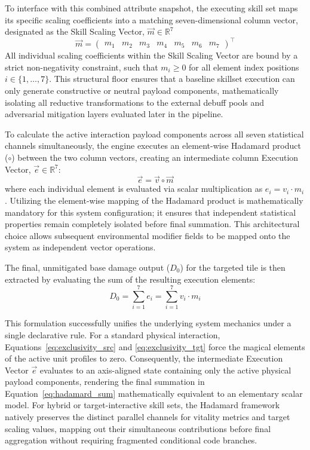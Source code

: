 \documentclass[twocolumn,10pt]{article}
\begin{document}
To interface with this combined attribute snapshot, the executing skill set maps its specific scaling coefficients into a matching seven-dimensional column vector, designated as the Skill Scaling Vector, $\vec{m} \in \mathbb{R}^7$
\begin{equation}
\vec{m} = \begin{pmatrix} m_1 & m_2 & m_3 & m_4 & m_5 & m_6 & m_7 \end{pmatrix}^{\top}
\end{equation}
All individual scaling coefficients within the Skill Scaling Vector are bound by a strict non-negativity constraint, such that $m_i \ge 0$ for all element index positions $i \in \{1, \dots, 7\}$. This structural floor ensures that a baseline skillset execution can only generate constructive or neutral payload components, mathematically isolating all reductive transformations to the external debuff pools and adversarial mitigation layers evaluated later in the pipeline.

To calculate the active interaction payload components across all seven statistical channels simultaneously, the engine executes an element-wise Hadamard product ($\circ$) between the two column vectors, creating an intermediate column Execution Vector, $\vec{e} \in \mathbb{R}^7$:
\begin{equation}
\vec{e} = \vec{v} \circ \vec{m}
\label{eq:hadamard_exec}
\end{equation}
where each individual element is evaluated via scalar multiplication as $e_i = v_i \cdot m_i$. Utilizing the element-wise mapping of the Hadamard product is mathematically mandatory for this system configuration; it ensures that independent statistical properties remain completely isolated before final summation. This architectural choice allows subsequent environmental modifier fields to be mapped onto the system as independent vector operations.

The final, unmitigated base damage output ($D_0$) for the targeted tile is then extracted by evaluating the sum of the resulting execution elements:
\begin{equation}
D_0 = \sum_{i=1}^{7} e_i = \sum_{i=1}^{7} v_i \cdot m_i
\label{eq:hadamard_sum}
\end{equation}

This formulation successfully unifies the underlying system mechanics under a single declarative rule. For a standard physical interaction, Equations~\ref{eq:exclusivity_src} and \ref{eq:exclusivity_tgt} force the magical elements of the active unit profiles to zero. Consequently, the intermediate Execution Vector $\vec{e}$ evaluates to an axis-aligned state containing only the active physical payload components, rendering the final summation in Equation~\ref{eq:hadamard_sum} mathematically equivalent to an elementary scalar model. For hybrid or target-interactive skill sets, the Hadamard framework natively preserves the distinct parallel channels for vitality metrics and target scaling values, mapping out their simultaneous contributions before final aggregation without requiring fragmented conditional code branches.
\end{document}
